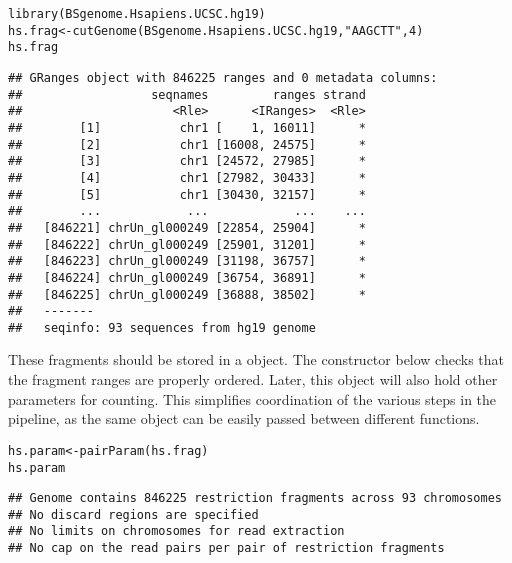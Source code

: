 \documentclass{report}\usepackage[]{graphicx}\usepackage[usenames,dvipsnames]{color}
\newcommand{\hlnum}[1]{\textcolor[rgb]{0.816,0.125,0.439}{#1}}%
\newcommand{\hlstr}[1]{\textcolor[rgb]{0.251,0.627,0.251}{#1}}%
\newcommand{\hlstd}[1]{\textcolor[rgb]{0.251,0.251,0.251}{#1}}%
\newcommand{\hlkwb}[1]{\textcolor[rgb]{0,0,0}{#1}}%
\newcommand{\hlkwd}[1]{\textcolor[rgb]{0.878,0.439,0.125}{#1}}%
\newenvironment{knitrout}{}{} %
\begin{document}
\begin{knitrout}
\color{fgcolor}\begin{kframe}
\begin{alltt}
\hlkwd{library}\hlstd{(BSgenome.Hsapiens.UCSC.hg19)}
\hlstd{hs.frag} \hlkwb{<-} \hlkwd{cutGenome}\hlstd{(BSgenome.Hsapiens.UCSC.hg19,} \hlstr{"AAGCTT"}\hlstd{,} \hlnum{4}\hlstd{)}
\hlstd{hs.frag}
\end{alltt}
\begin{verbatim}
## GRanges object with 846225 ranges and 0 metadata columns:
##                  seqnames         ranges strand
##                     <Rle>      <IRanges>  <Rle>
##        [1]           chr1 [    1, 16011]      *
##        [2]           chr1 [16008, 24575]      *
##        [3]           chr1 [24572, 27985]      *
##        [4]           chr1 [27982, 30433]      *
##        [5]           chr1 [30430, 32157]      *
##        ...            ...            ...    ...
##   [846221] chrUn_gl000249 [22854, 25904]      *
##   [846222] chrUn_gl000249 [25901, 31201]      *
##   [846223] chrUn_gl000249 [31198, 36757]      *
##   [846224] chrUn_gl000249 [36754, 36891]      *
##   [846225] chrUn_gl000249 [36888, 38502]      *
##   -------
##   seqinfo: 93 sequences from hg19 genome
\end{verbatim}
\end{kframe}
\end{knitrout}

These fragments should be stored in a  object.
The constructor below checks that the fragment ranges are properly ordered.
Later, this object will also hold other parameters for counting.
This simplifies coordination of the various steps in the  pipeline, as the same  object can be easily passed between different functions. 

\begin{knitrout}
\color{fgcolor}\begin{kframe}
\begin{alltt}
\hlstd{hs.param} \hlkwb{<-} \hlkwd{pairParam}\hlstd{(hs.frag)}
\hlstd{hs.param}
\end{alltt}
\begin{verbatim}
## Genome contains 846225 restriction fragments across 93 chromosomes
## No discard regions are specified
## No limits on chromosomes for read extraction
## No cap on the read pairs per pair of restriction fragments
\end{verbatim}
\end{kframe}
\end{knitrout}
\end{document}
